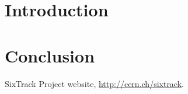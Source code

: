 \documentclass[a4paper,
              ]{jacow}
\begin{document}
\section{Introduction}

\section{Conclusion}

\begin{thebibliography}{99} %
SixTrack Project website, \url{http://cern.ch/sixtrack}.

\end{thebibliography}
\end{document}
